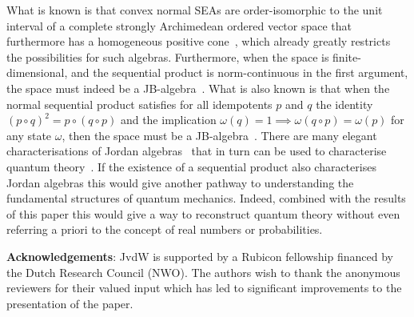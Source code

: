 \documentclass[a4paper, onecolumn, accepted=2020-12-22]{quantumarticle}
\newcommand{\mult}{\mathop{\circ}}
\theoremstyle{definition}
\begin{document}
What is known is that convex normal SEAs are order-isomorphic to the unit interval of a complete strongly Archimedean ordered vector space that furthermore has a homogeneous positive cone~\cite{wetering2018characterisation}, which already greatly restricts the possibilities for such algebras.
Furthermore, when the space is finite-dimensional, and the sequential product is norm-continuous in the first argument, the space must indeed be a JB-algebra~\cite{wetering2018sequential}. What is also known is that when the normal sequential product satisfies for all idempotents $p$ and $q$ the identity $(p\mult q)^2 = p\mult (q\mult p)$ and the implication $\omega(q) = 1 \implies \omega(q\mult p) = \omega(p)$ for any state $\omega$, then the space must be a JB-algebra~\cite{wetering2018sequential}.
There are many elegant characterisations of Jordan algebras~\cite{koecher1957positivitatsbereiche,alfsen2012geometry,barnum2019strongly}
that in turn can be used to characterise quantum theory~\cite{barnum2014higher,wetering2018reconstruction}.
If the existence of a sequential product also characterises Jordan algebras this would give another pathway to understanding the fundamental structures of quantum mechanics.
Indeed, combined with the results of this paper this would give a way to reconstruct quantum theory
without even referring a priori to the concept of real numbers or probabilities.

\medskip 
\noindent\textbf{Acknowledgements}: JvdW is supported by a Rubicon fellowship financed by the Dutch Research Council (NWO). The authors wish to thank the anonymous reviewers for their valued input which has led to significant improvements to the presentation of the paper.



\end{document}
